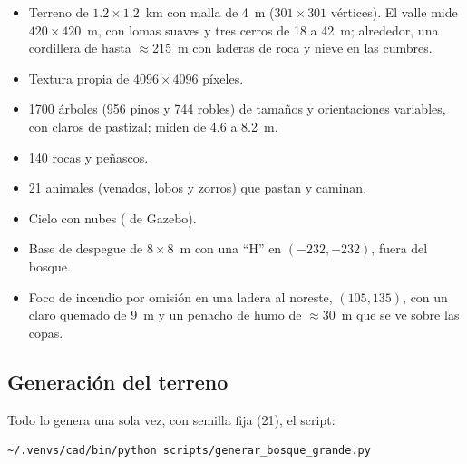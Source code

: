 \begin{itemize}
  \item Terreno de $1.2\times1.2$~km con malla de 4~m ($301\times301$ vértices). El valle mide
        $420\times420$~m, con lomas suaves y tres cerros de 18 a 42~m; alrededor, una cordillera
        de hasta $\approx$215~m con laderas de roca y nieve en las cumbres.
  \item Textura propia de $4096\times4096$ píxeles.
  \item 1700 árboles (956 pinos y 744 robles) de tamaños y orientaciones variables, con claros de
        pastizal; miden de 4.6 a 8.2~m.
  \item 140 rocas y peñascos.
  \item 21 animales (venados, lobos y zorros) que pastan y caminan.
  \item Cielo con nubes ( de Gazebo).
  \item Base de despegue de $8\times8$~m con una ``H'' en $(-232,-232)$, fuera del bosque.
  \item Foco de incendio por omisión en una ladera al noreste, $(105,135)$, con un claro
        quemado de 9~m y un penacho de humo de $\approx$30~m que se ve sobre las copas.
\end{itemize}

\subsection{Generación del terreno}

Todo lo genera una sola vez, con semilla fija (21), el script:
\begin{lstlisting}[style=bash]
~/.venvs/cad/bin/python scripts/generar_bosque_grande.py
\end{lstlisting}


